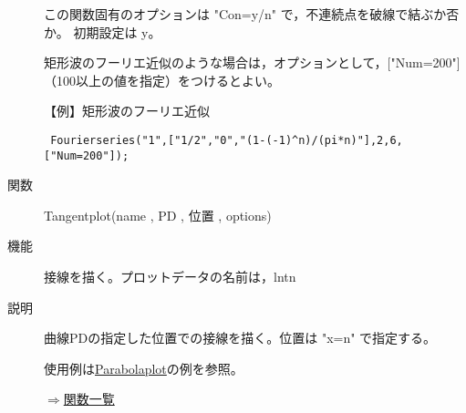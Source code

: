 \documentclass[papersize,a4paper,10pt,uplatex]{jsarticle}
\begin{document}
\begin{description}
この関数固有のオプションは "Con=y/n" で，不連続点を破線で結ぶか否か。 初期設定は y。

矩形波のフーリエ近似のような場合は，オプションとして，["Num=200"]（100以上の値を指定）をつけるとよい。

\vspace{\baselineskip}
【例】矩形波のフーリエ近似
\begin{verbatim}
 Fourierseries("1",["1/2","0","(1-(-1)^n)/(pi*n)"],2,6,["Num=200"]);
\end{verbatim}

\begin{center}

\end{center}

\vspace{\baselineskip}
\hypertarget{tangentplot}{}
\item[関数]Tangentplot(name , PD , 位置 , options)
\item[機能]接線を描く。プロットデータの名前は，lntn
\item[説明]曲線PDの指定した位置での接線を描く。位置は "x=n" で指定する。

使用例は\hyperlink{parabolaplot}{Parabolaplot}の例を参照。

\begin{flushright}\hyperlink{functionlist}{$\Rightarrow$関数一覧}\end{flushright}

\end{description}
\end{document}
